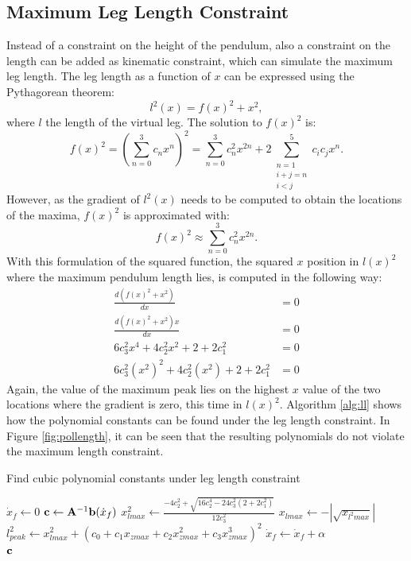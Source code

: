 \subsection{Maximum Leg Length Constraint}
Instead of a constraint on the height of the pendulum, also a constraint on the length can be added as kinematic constraint, which can simulate the maximum leg length. The leg length as a function of $x$ can be expressed using the Pythagorean theorem:
\begin{equation}
	l^2(x) = f(x)^2 + x^2,
\end{equation}
where $l$ the length of the virtual leg. The solution to $f(x)^2$ is:
\begin{equation}
f(x)^2=(\sum_{n=0}^3 c_n x^n)^2 = \sum_{n=0}^3 c_n^2 x^{2n} + 2\sum_{\substack{n=1 \\ i+j=n \\ i < j}}^5 c_i c_j x^n. 
\end{equation}
However, as the gradient of $l^2(x)$ needs to be computed to obtain the locations of the maxima, $f(x)^2$ is approximated with:
\begin{equation*}
	f(x)^2\approx \sum_{n=0}^3 c_n^2 x^{2n}.
\end{equation*}
With this formulation of the squared function, the squared $x$ position in $l(x)^2$ where the maximum pendulum length lies, is computed in the following way:
\begin{align}
	\frac{d(f(x)^2+x^2)}{dx}&=0\\
	\frac{d(f(x)^2+x^2)x}{dx}&=0\\
	6c_3^2 x^4 + 4 c_2^2 x^2 + 2+2c_1^2 &= 0\\
	6c_3^2 (x^2)^2 + 4 c_2^2 (x^2) + 2+2c_1^2 &= 0
\end{align}
Again, the value of the maximum peak lies on the highest $x$ value of the two locations where the gradient is zero, this time in $l(x)^2$. Algorithm \ref{alg:ll} shows how the polynomial constants can be found under the leg length constraint. In Figure \ref{fig:pollength}, it can be seen that the resulting polynomials do not violate the maximum length constraint.
\begin{algorithm}
\caption{Find cubic polynomial constants under leg length constraint}
\label{alg:ll}
\begin{algorithmic}[1]
    \State $\dot{x}_{f}\gets 0$
        \Repeat
            \State $\mathbf{c}\gets \mathbf{A}^{-1}\mathbf{b}(\dot{x}_{f})$ 
            \State $x_{lmax}^2 \gets \frac{-4c_2^2+\sqrt{16c_2^4-24c_3^2(2+2c_1^2)}}{12c_3^2}$   
            \State $x_{lmax}\gets-|\sqrt{x_{l^2max}}|$                
            \State $l_{peak}^2 \gets x_{lmax}^2 + (c_0 + c_1x_{zmax} + c_2x_{zmax}^2+ c_3x_{zmax}^3)^2$ 
            \State $\dot{x}_{f} \gets \dot{x}_{f}+\alpha$   
        \\
    \Return $\mathbf{c}$    
\end{algorithmic}
\end{algorithm}
